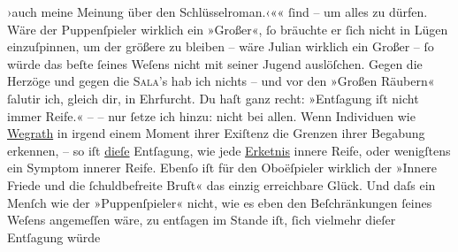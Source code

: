 \begin{ledgroupsized}[t]{13cm}
{{{                     ›auch meine Meinung über den Schlüsselroman.‹«}}}\label{K_L01477_2h}« ſind – um alles
               zu dürfen. Wäre der Puppen{\pb}ſpieler
               wirklich ein »Großer«, ſo bräuchte er ſich nicht in Lügen einzuſpinnen, um der
               größere zu bleiben – wäre Julian
               wirklich ein Großer – ſo würde das beſte ſeines Weſens nicht mit seiner Jugend
               auslöſchen. Gegen die Herzöge und gegen die \textsc{Sala}’s hab ich nichts – und vor den »Großen Räubern« ſalutir ich, gleich dir, in
               Ehrfurcht. Du haſt ganz recht: »Entſagung iſt nicht immer Reife.« – – nur ſetze ich
               hinzu: nicht bei allen. Wenn Individuen wie \uline{Wegrath} in irgend einem Moment ihrer Exiſtenz die Grenzen ihrer Begabung erkennen, –
                  {\pb}so iſt \uline{dieſe} Entſagung, wie jede \uline{Erke{\geminationn}tnis} innere Reife, oder wenigſtens ein
               Symptom innerer Reife. Ebenſo iſt für den Oboëſpieler wirklich der »Innere Friede und
               die ſchuldbefreite Bruſt« das einzig erreichbare Glück. Und daſs ein Menſch wie der
                  »Puppenſpieler« nicht, wie es
               eben den Beſchränkungen ſeines Weſens angemeſſen wäre, \introOben{}zu\introOben{}
               entſagen im Stande iſt, ſich \introOben{}vielmehr\introOben{} dieſer Entſagung
                  \label{T_L01477_1v}\label{T_L01477_1h} würde

\end{ledgroupsized}
